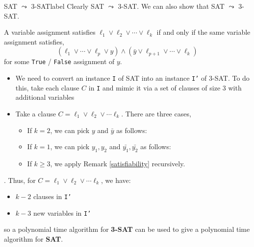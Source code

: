 	\begin{ex}{SAT $\leadsto$ 3-SAT}{label}
		Clearly SAT $\leadsto$ 3-SAT. We can also show that SAT $\leadsto$ 3-SAT. 
		
		\begin{rmk}
		A variable assignment satisfies $\ell_1 \lor \ell_2 \lor \cdots \lor \ell_k$ if and only if the same variable assignment satisfies,
		\[\left(\ell_{1} \lor \cdots \lor \ell_{p} \lor y\right) \wedge\left(\bar{y} \lor \ell_{p+1} \lor \cdots \lor \ell_{k}\right)\]
		\noindent for some \texttt{True} / \texttt{False} assignment of $y$.
		\label{satisfiability}
	\end{rmk}

		\begin{itemize}
			\item We need to convert an instance \texttt{I} of SAT into an instance \texttt{I'} of 3-SAT. To do this, take each clause $C$ in \texttt{I} and mimic it via a set of clauses of size 3 with additional variables
			\item Take a clause $C = \ell_{1} \lor \ell_{2} \lor \cdots \ell_{k}$. There are three cases,
			\begin{itemize}
				\item If $k = 2$, we can pick $y$ and $\bar{y}$ as follows:
				

				\item If $k = 1$, we can pick $y_1, y_2$ and $\bar{y_1}, \bar{y_2}$ as follows:
				

				\item If $k \geq 3$, we apply Remark \ref{satisfiability} recursively.
			\end{itemize}
		\end{itemize}.
		Thus, for $C = \ell_{1} \lor \ell_{2} \lor \cdots \ell_{k}$, we have:
		\begin{itemize}
			\item $k - 2$ clauses in \texttt{I'}
			\item $k - 3$ new variables in \texttt{I'}
		\end{itemize}
		so a polynomial time algorithm for \textbf{3-SAT} can be used to give a polynomial time algorithm for \textbf{SAT}.
	\end{ex}

